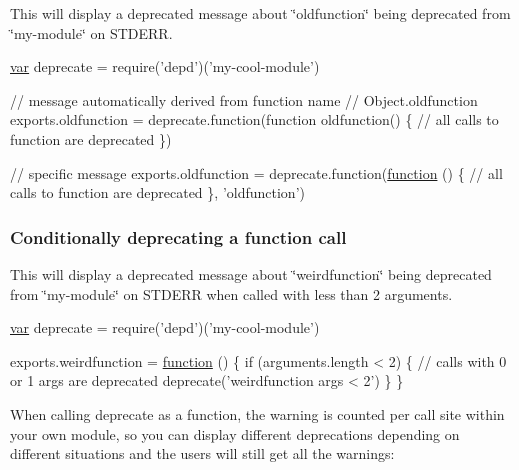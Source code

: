 This will display a deprecated message about \char`\"{}oldfunction\char`\"{} being deprecated from \char`\"{}my-\/module\char`\"{} on S\+T\+D\+E\+R\+R.


\begin{DoxyCode}
\hyperlink{018__def_8c_a335628f2e9085305224b4f9cc6e95ed5}{var} deprecate = require(\textcolor{stringliteral}{'depd'})(\textcolor{stringliteral}{'my-cool-module'})

\textcolor{comment}{// message automatically derived from function name}
\textcolor{comment}{// Object.oldfunction}
exports.oldfunction = deprecate.function(\textcolor{keyword}{function} oldfunction() \{
  \textcolor{comment}{// all calls to function are deprecated}
\})

\textcolor{comment}{// specific message}
exports.oldfunction = deprecate.function(\hyperlink{class_test_a51a683fa4fcec142ab1574e00a7b6860}{function} () \{
  \textcolor{comment}{// all calls to function are deprecated}
\}, \textcolor{stringliteral}{'oldfunction'})
\end{DoxyCode}


\subsubsection*{Conditionally deprecating a function call}

This will display a deprecated message about \char`\"{}weirdfunction\char`\"{} being deprecated from \char`\"{}my-\/module\char`\"{} on S\+T\+D\+E\+R\+R when called with less than 2 arguments.


\begin{DoxyCode}
\hyperlink{018__def_8c_a335628f2e9085305224b4f9cc6e95ed5}{var} deprecate = require(\textcolor{stringliteral}{'depd'})(\textcolor{stringliteral}{'my-cool-module'})

exports.weirdfunction = \hyperlink{class_test_a51a683fa4fcec142ab1574e00a7b6860}{function} () \{
  \textcolor{keywordflow}{if} (arguments.length < 2) \{
    \textcolor{comment}{// calls with 0 or 1 args are deprecated}
    deprecate(\textcolor{stringliteral}{'weirdfunction args < 2'})
  \}
\}
\end{DoxyCode}


When calling {\ttfamily deprecate} as a function, the warning is counted per call site within your own module, so you can display different deprecations depending on different situations and the users will still get all the warnings\+:


